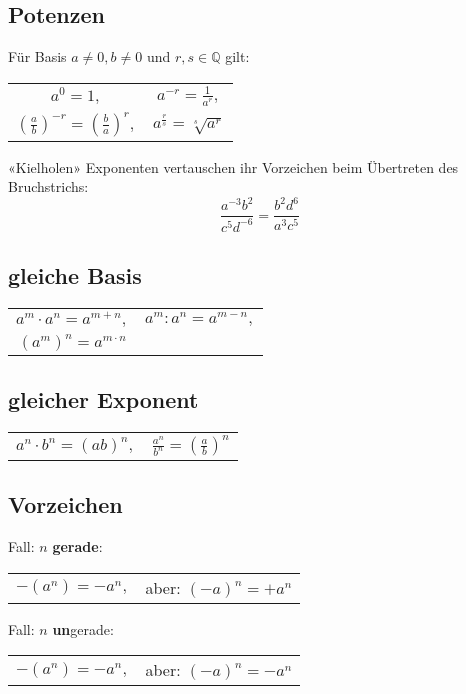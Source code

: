 \begin{multicols}{2}
\section{Potenzen}
Für Basis $a\ne 0, b\ne 0$ und $r, s\in\mathbb{Q}$ gilt:

\begin{tabular}{cc}
$a^0=1,$ & $a^{-r} = \frac1{a^r},$  \\
$\left(\frac{a}b\right)^{-r} = \left(\frac{b}a\right)^r,$ & $a^{\frac{r}s} = \sqrt[s]{a^r}$\\
 \end{tabular}

\begin{rezept}{«Kielholen»}{}{}
Exponenten vertauschen ihr Vorzeichen beim Übertreten des Bruchstrichs:
$$\frac{a^{-3}b^2}{c^5d^{-6}} = \frac{b^2d^6}{a^3c^5}$$
\end{rezept}

\subsection{gleiche Basis}
\begin{tabular}{cc}
$a^m\cdot{}a^n = a^{m+n},$ & $a^m:a^n=a^{m-n},$ \\
$\left(a^m\right)^n = a^{m\cdot{}n}$ &\\
 \end{tabular} 

\subsection{gleicher Exponent}

\begin{tabular}{cc}
$a^n\cdot{}b^n = (ab)^n,$ & $\frac{a^n}{b^n} =\left(\frac{a}b\right)^n $\\
 \end{tabular}
 

\subsection{Vorzeichen}
Fall: $n$ \textbf{gerade}:

\begin{tabular}{cc}
 $-(a^n) = -a^n,$ & aber: $(-a)^n = +a^n$\\
 \end{tabular} 

Fall: $n$ \textbf{un}gerade:

\begin{tabular}{cc}
 $-(a^n) = -a^n,$ & aber: $(-a)^n = -a^n$\\
 \end{tabular} 


\end{multicols}
